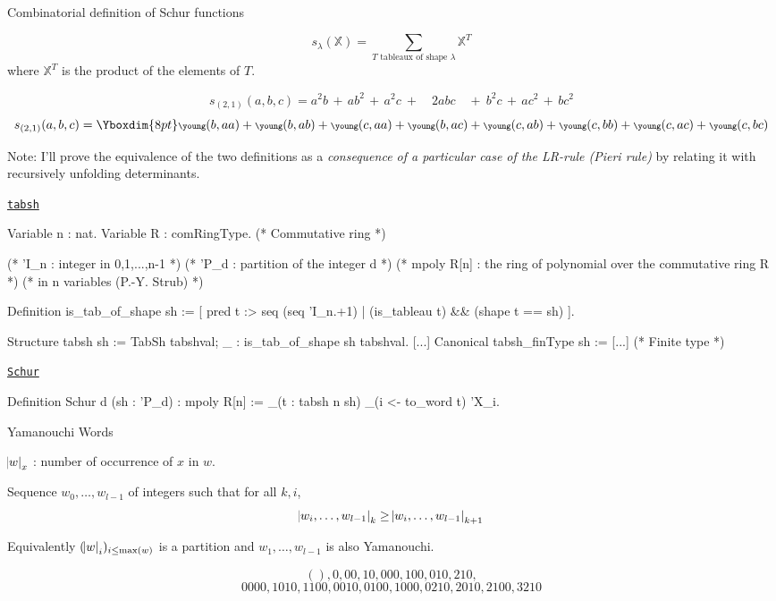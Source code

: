 \documentclass[compress,11pt]{beamer}
\newcommand{\XX}{{\mathbb X}}
\begin{document}
\begin{frame}{Combinatorial definition of Schur functions}

  \begin{DEFN}
    \[s_\lambda(\XX) = \sum_\text{$T$ tableaux of shape $\lambda$} \XX^T\]
    where $\XX^T$ is the product of the elements of $T$.
  \end{DEFN}
  \[s_{(2,1)}(a,b,c) = a^2b\,+\,ab^2\,+\,a^2c\ +\quad 2abc\quad +\
  b^2c\,+\,ac^2\,+\,bc^2\]
  \[s_{(2,1)}(a,b,c) = {  \Yboxdim{8pt}\scriptsize
    \young(b,aa) + \young(b,ab) + \young(c,aa)
  + \young(b,ac) + \young(c,ab) + \young(c,bb) + \young(c,ac) +
  \young(c,bc)}\]
  \pause\medskip

  Note: I'll prove the equivalence of the two definitions as a
  \emph{consequence of a particular case of the LR-rule (Pieri rule)} by
  relating it with recursively unfolding determinants.
\end{frame}

\begin{frame}[fragile]

  {\tiny\hfill
    \href{file:html/Combi.Combi.tableau.html#tabsh}{\texttt{tabsh}}
  \vspace{-2mm}}
\begin{coqcode}
Variable n : nat.
Variable R : comRingType.  (* Commutative ring *)

(* 'I_n         : integer in 0,1,...,n-1                             *)
(* 'P_d         : partition of the integer d                         *)
(* {mpoly R[n]} : the ring of polynomial over the commutative ring R *)
(*                in n variables (P.-Y. Strub)                       *)

Definition is_tab_of_shape sh :=
  [ pred t :> seq (seq 'I_n.+1) | (is_tableau t) && (shape t == sh) ].

Structure tabsh sh := TabSh {tabshval; _ : is_tab_of_shape sh tabshval}.
[...]
Canonical tabsh_finType sh := [...] (* Finite type *)
\end{coqcode}
  {\tiny\hfill
    \href{file:html/Combi.MPoly.Schur_mpoly.html#Schur}{\texttt{Schur}}
  \vspace{-2mm}}
\begin{coqcode}
Definition Schur d (sh : 'P_d) : {mpoly R[n]} :=
  \sum_(t : tabsh n sh) \prod_(i <- to_word t) 'X_i.
\end{coqcode}
\end{frame}

\begin{frame}{Yamanouchi Words}

  $\abs{w}_x$ : number of occurrence of $x$ in $w$.

  \begin{DEFN}
    Sequence $w_0,\dots,w_{l-1}$ of integers such that for all $k, i$,
    \[ \abs{w_i,\dots,w_{l-1}}_k \geq \abs{w_i,\dots,w_{l-1}}_{k+1} \]

    Equivalently $(\abs{w}_i)_{i\leq\max(w)}$ is a partition and $w_1,\dots,w_{l-1}$ is
    also Yamanouchi.
  \end{DEFN}

  \[ (), 0, 00, 10, 000, 100, 010, 210, \]
  \[ 0000, 1010, 1100, 0010, 0100, 1000, 0210, 2010, 2100, 3210 \]
\end{frame}
\end{document}
